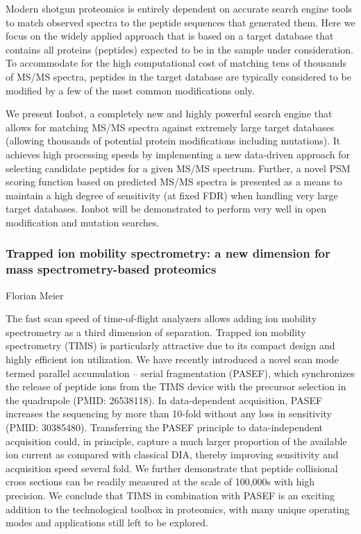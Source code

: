 Modern shotgun proteomics is entirely dependent on accurate search engine tools
to match observed spectra to the peptide sequences that generated them. Here we
focus on the widely applied approach that is based on a target database that
contains all proteins (peptides) expected to be in the sample under
consideration. To accommodate for the high computational cost of matching tens
of thousands of MS/MS spectra, peptides in the target database are typically
considered to be modified by a few of the most common modifications only.

We present Ionbot, a completely new and highly powerful search engine that
allows for matching MS/MS spectra against extremely large target databases
(allowing thousands of potential protein modifications including mutations). It
achieves high processing speeds by implementing a new data-driven approach for
selecting candidate peptides for a given MS/MS spectrum. Further, a novel PSM
scoring function based on predicted MS/MS spectra is presented as a means to
maintain a high degree of sensitivity (at fixed FDR) when handling very large
target databases. Ionbot will be demonstrated to perform very well in open
modification and mutation searches.

\subsubsection*{\color{eubicRed} Trapped ion mobility spectrometry: a new dimension for mass spectrometry-based proteomics}
{\color{eubicGray}Florian Meier}

The fast scan speed of time-of-flight analyzers allows adding ion mobility
spectrometry as a third dimension of separation. Trapped ion mobility
spectrometry (TIMS) is particularly attractive due to its compact design and
highly efficient ion utilization. We have recently introduced a novel scan mode
termed parallel accumulation – serial fragmentation (PASEF), which synchronizes
the release of peptide ions from the TIMS device with the precursor selection
in the quadrupole (PMID: 26538118). In data-dependent acquisition, PASEF
increases the sequencing by more than 10-fold without any loss in sensitivity
(PMID: 30385480). Transferring the PASEF principle to data-independent
acquisition could, in principle, capture a much larger proportion of the
available ion current as compared with classical DIA, thereby improving
sensitivity and acquisition speed several fold. We further demonstrate that
peptide collisional cross sections can be readily measured at the scale of
100,000s with high precision. We conclude that TIMS in combination with PASEF
is an exciting addition to the technological toolbox in proteomics, with many
unique operating modes and applications still left to be explored.
